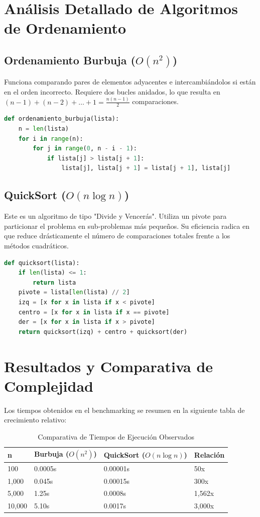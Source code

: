 \documentclass[12pt,a4paper]{article}
\begin{document}
\section{Análisis Detallado de Algoritmos de Ordenamiento}

\subsection{Ordenamiento Burbuja ($O(n^2)$)}
Funciona comparando pares de elementos adyacentes e intercambiándolos si están en el orden incorrecto. Requiere dos bucles anidados, lo que resulta en $(n-1) + (n-2) + \dots + 1 = \frac{n(n-1)}{2}$ comparaciones.
\begin{lstlisting}[language=Python, caption=Implementación de Ordenamiento Burbuja]
def ordenamiento_burbuja(lista):
    n = len(lista)
    for i in range(n):
        for j in range(0, n - i - 1):
            if lista[j] > lista[j + 1]:
                lista[j], lista[j + 1] = lista[j + 1], lista[j]
\end{lstlisting}

\subsection{QuickSort ($O(n \log n)$)}
Este es un algoritmo de tipo "Divide y Vencerás". Utiliza un pivote para particionar el problema en sub-problemas más pequeños. Su eficiencia radica en que reduce drásticamente el número de comparaciones totales frente a los métodos cuadráticos.
\begin{lstlisting}[language=Python, caption=Implementación de QuickSort Eficiente]
def quicksort(lista):
    if len(lista) <= 1:
        return lista
    pivote = lista[len(lista) // 2]
    izq = [x for x in lista if x < pivote]
    centro = [x for x in lista if x == pivote]
    der = [x for x in lista if x > pivote]
    return quicksort(izq) + centro + quicksort(der)
\end{lstlisting}

\section{Resultados y Comparativa de Complejidad}

Los tiempos obtenidos en el benchmarking se resumen en la siguiente tabla de crecimiento relativo:

\begin{table}[H]
\centering
\caption{Comparativa de Tiempos de Ejecución Observados}
\begin{tabular}{@{}llll@{}}
\toprule
\textbf{n} & \textbf{Burbuja ($O(n^2)$)} & \textbf{QuickSort ($O(n \log n)$)} & \textbf{Relación} \\ \midrule
100 & 0.0005s & 0.00001s & 50x \\
1,000 & 0.045s & 0.00015s & 300x \\
5,000 & 1.25s & 0.0008s & 1,562x \\
10,000 & 5.10s & 0.0017s & 3,000x \\ \bottomrule
\end{tabular}
\end{table}
\end{document}
